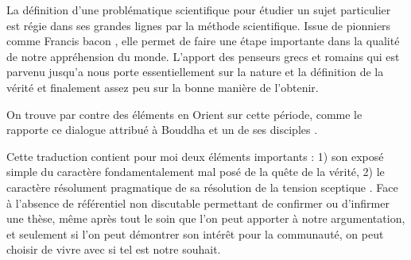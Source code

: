 La définition d'une problématique scientifique pour étudier un sujet particulier est régie dans ses grandes lignes par la méthode scientifique. Issue de pionniers comme Francis bacon \cite{bacon1878novum}, elle permet de faire une étape importante dans la qualité de notre appréhension du monde. L'apport des penseurs grecs et romains qui est parvenu jusqu'a nous porte essentiellement sur la nature et la définition de la vérité et finalement assez peu sur la bonne manière de l’obtenir.

On trouve par contre des éléments en Orient sur cette période, comme le rapporte ce dialogue attribué à Bouddha et un de ses disciples .

Cette traduction contient pour moi deux éléments importants : 1) son exposé simple du caractère fondamentalement mal posé de la quête de la vérité, 2) le caractère résolument pragmatique de sa résolution de la \og tension sceptique \fg. Face à l'absence de référentiel non discutable permettant de confirmer ou d'infirmer une thèse, même après tout le soin que l'on peut apporter à notre argumentation, et seulement si l'on peut démontrer son intérêt pour la communauté, on peut choisir de vivre avec si tel est notre souhait.

